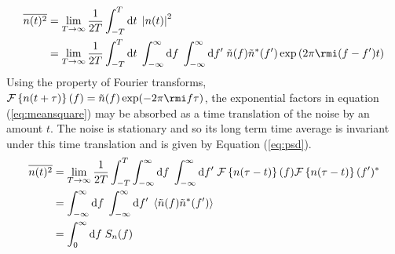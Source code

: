\begin{eqnarray}\label{eq:meansquare}
\overline{n(t)^{2}}&=\lim_{T\rightarrow\infty}\frac{1}{2T}\int_{-T}^{T}\mathrm{d}t\;\left| n(t) \right|^{2} \nonumber \\
&=\lim_{T\rightarrow\infty}\frac{1}{2T}\int_{-T}^{T}\mathrm{d}t\; \int_{-\infty}^{\infty}\mathrm{d}f\;\int_{-\infty}^{\infty}\mathrm{d}f'\;\tilde{n}(f)\tilde{n}^{*}(f')\exp\left(2\pi \rmi (f-f')t \right)
\end{eqnarray}
Using the property of Fourier transforms, ${\cal{F}}\left\{ n(t+\tau) \right\}(f)=\tilde{n}(f)\exp (-2\pi \rmi f\tau )$, the exponential factors in equation (\ref{eq:meansquare}) may be absorbed as a time translation of the noise by an amount $t$. The noise is stationary and so its long term time average is invariant under this time translation and is given by Equation (\ref{eq:psd}).
\begin{eqnarray}\label{eq:meansquare1}
\overline{n(t)^{2}}& = \lim_{T\rightarrow\infty}\frac{1}{2T}\int_{-T}^{T}\int_{-\infty}^{\infty}\mathrm{d}f\;\int_{-\infty}^{\infty}\mathrm{d}f'\;{\cal{F}}\left\{ n(\tau-t) \right\}(f){\cal{F}}\left\{ n(\tau-t) \right\}(f')^{*} \nonumber \\
&=\int_{-\infty}^{\infty}\mathrm{d}f\;\int_{-\infty}^{\infty}\mathrm{d}f'\;\left<\tilde{n}(f)\tilde{n}^{*}(f')\right>\nonumber \\
& = \int_{0}^{\infty}\mathrm{d}f\; S_{n}(f)
\end{eqnarray}





